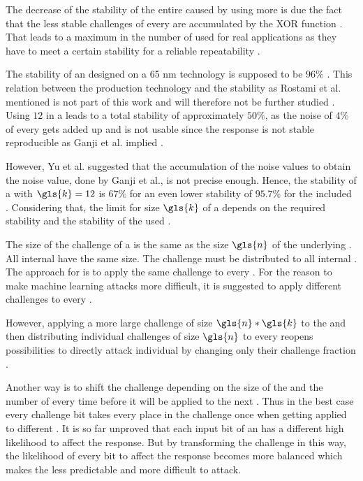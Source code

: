 The decrease of the stability of the entire \xpuf caused by using more \apufs is due the fact that the less stable challenges of every \apuf are accumulated by the \ac{XOR} function \cite{Rostami2014RobustMatching}.
That leads to a maximum in the number of used \apufs for real applications as they have to meet a certain stability for a reliable repeatability \cite{Rostami2014RobustMatching}.

The stability of an \apuf designed on a 65 nm technology is supposed to be $96 \%$ \cite{Rostami2014RobustMatching}.
This relation between the production technology and the stability as Rostami et al. mentioned is not part of this work and will therefore not be further studied \cite{Rostami2014RobustMatching}. %
Using $12$ \apufs in a \xpuf leads to a total stability of approximately $50 \%$, as the noise of $4 \%$ of every \apuf gets added up and is not usable since the response is not stable reproducible as Ganji et al. implied \cite{Ganji2015WhyPUFs}. %

However, Yu et al. suggested that the accumulation of the \apuf noise values to obtain the \xpuf noise value, done by Ganji et al., is not precise enough.
Hence, the stability of a \xpuf with $\gls{k} = 12$ is $67 \%$ for an even lower stability of $95.7 \%$ for the included \apufs \cite{Yu2016AAuthentication}. %
Considering that, the limit for size $\gls{k}$ of a \xpuf depends on the required stability and the stability of the used \apufs.

The size of the challenge of a \xpuf is the same as the size $\gls{n}$ of the underlying \apufs.
All internal \apufs have the same size.
The challenge must be distributed to all internal \apufs. %
The approach for \xpufs is to apply the same challenge to every \apuf.
For the reason to make machine learning attacks more difficult, it is suggested to apply different challenges to every \apuf. %

However, applying a more large challenge of size $\gls{n} * \gls{k}$ to the \xpuf and then distributing individual challenges of size $\gls{n}$ to every \apuf reopens possibilities to directly attack individual \apufs by changing only their challenge fraction \cite{Becker2015ThePUFs}.

Another way is to shift the challenge depending on the size of the \puf and the number of \apufs every time before it will be applied to the next \apuf.
Thus in the best case every challenge bit takes every place in the challenge once when getting applied to different \apufs. %
It is so far unproved that each input bit of an \apuf has a different high likelihood to affect the response.
But by transforming the challenge in this way, the likelihood of every bit to affect the response becomes more balanced which makes the \puf less predictable and more difficult to attack.

